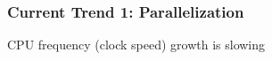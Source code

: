 \begin{frame}
    \frametitle{Current Trend 1: Parallelization}

    CPU frequency (clock speed) growth is slowing

    \begin{figure}
       \begin{center}
       \end{center}
    \end{figure}

\end{frame}


